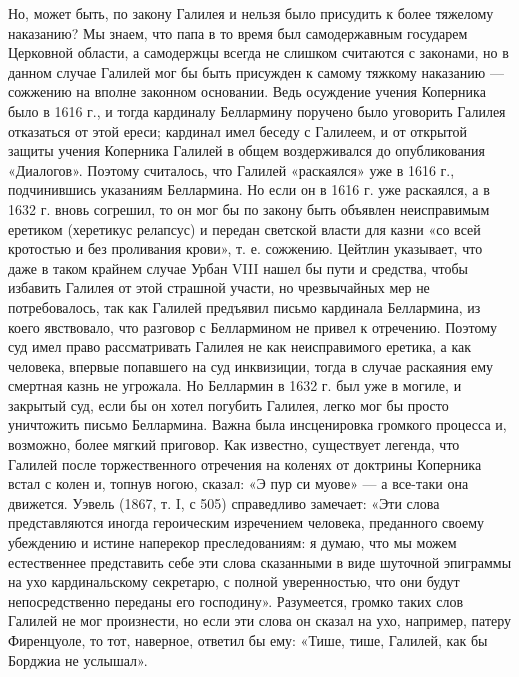 Но, может быть, по закону Галилея и нельзя было присудить к более тяжелому
наказанию? Мы знаем, что папа в то время был самодержавным государем Церковной
области, а самодержцы всегда не слишком считаются с законами, но в данном
случае Галилей мог бы быть присужден к самому тяжкому наказанию --- сожжению на
вполне законном основании. Ведь осуждение учения Коперника было в 1616 г., и
тогда кардиналу Беллармину поручено было уговорить Галилея отказаться от этой
ереси; кардинал имел беседу с Галилеем, и от открытой защиты учения Коперника
Галилей в общем воздерживался до опубликования «Диалогов». Поэтому считалось,
что Галилей
«раскаялся» уже в 1616 г., подчинившись указаниям Беллармина. Но если он в 1616
г. уже раскаялся, а в 1632 г. вновь согрешил, то он мог бы по закону быть
объявлен неисправимым еретиком (херетикус релапсус) и передан светской власти
для казни «со всей кротостью и без проливания крови», т. е. сожжению. Цейтлин
указывает, что даже в таком крайнем случае Урбан VIII нашел бы пути и средства,
чтобы избавить Галилея от этой страшной участи, но чрезвычайных мер не
потребовалось, так как Галилей предъявил письмо кардинала Беллармина, из коего
явствовало, что разговор с Беллармином не привел к отречению. Поэтому суд имел
право рассматривать Галилея не как неисправимого еретика, а как человека,
впервые попавшего на суд инквизиции, тогда в случае раскаяния ему смертная
казнь не угрожала. Но Беллармин в 1632 г. был уже в могиле, и закрытый суд,
если бы он хотел погубить Галилея, легко мог бы просто уничтожить письмо
Беллармина. Важна была инсценировка громкого процесса и, возможно, более мягкий
приговор. Как известно, существует легенда, что Галилей после торжественного
отречения на коленях от доктрины Коперника встал с колен и, топнув ногою,
сказал: «Э пур си муове» --- а все-таки она движется. Уэвель (1867, т. I, с 505)
справедливо замечает: «Эти слова представляются иногда героическим изречением
человека, преданного своему убеждению и истине наперекор преследованиям: я
думаю, что мы можем естественнее представить себе эти слова сказанными в виде
шуточной эпиграммы на ухо кардинальскому секретарю, с полной уверенностью, что
они будут непосредственно переданы его господину». Разумеется, громко таких
слов Галилей не мог произнести, но если эти слова он сказал на ухо, например,
патеру Фиренцуоле, то тот, наверное, ответил бы ему: «Тише, тише, Галилей, как
бы Борджиа не услышал».

